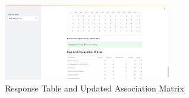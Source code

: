 \begin{figure}[h!]  
    \centering
    \includegraphics[width=0.65\textwidth]{App Images/31 Interface.png}  
    \caption{Response Table and Updated Association Matrix}
    \label{10i23445}  %
\end{figure} 


